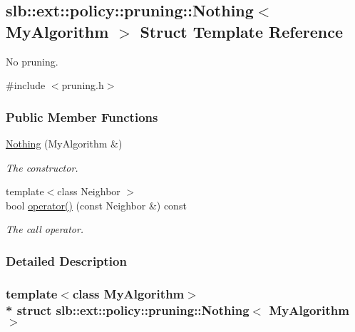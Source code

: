 \hypertarget{structslb_1_1ext_1_1policy_1_1pruning_1_1Nothing}{}\subsection{slb\+:\+:ext\+:\+:policy\+:\+:pruning\+:\+:Nothing$<$ My\+Algorithm $>$ Struct Template Reference}
\label{structslb_1_1ext_1_1policy_1_1pruning_1_1Nothing}


No pruning.  




{\ttfamily \#include $<$pruning.\+h$>$}

\subsubsection*{Public Member Functions}
\begin{DoxyCompactItemize}
\item 
\hyperlink{structslb_1_1ext_1_1policy_1_1pruning_1_1Nothing_a5adf3cff649cbc7db2a43544fa49f247}{Nothing} (My\+Algorithm \&)\hypertarget{structslb_1_1ext_1_1policy_1_1pruning_1_1Nothing_a5adf3cff649cbc7db2a43544fa49f247}{}\label{structslb_1_1ext_1_1policy_1_1pruning_1_1Nothing_a5adf3cff649cbc7db2a43544fa49f247}

\begin{DoxyCompactList}\small\item\em The constructor. \end{DoxyCompactList}\item 
{\footnotesize template$<$class Neighbor $>$ }\\bool \hyperlink{structslb_1_1ext_1_1policy_1_1pruning_1_1Nothing_ab2c5f592f9747696eb3fa6b4d0dab2ec}{operator()} (const Neighbor \&) const 
\begin{DoxyCompactList}\small\item\em The call operator. \end{DoxyCompactList}\end{DoxyCompactItemize}


\subsubsection{Detailed Description}
\subsubsection*{template$<$class My\+Algorithm$>$\\*
struct slb\+::ext\+::policy\+::pruning\+::\+Nothing$<$ My\+Algorithm $>$}

